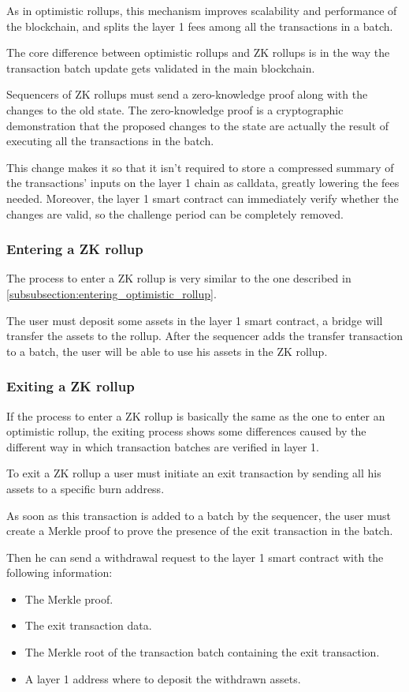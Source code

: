 \documentclass[12pt]{article}
\begin{document}
As in optimistic rollups, this mechanism improves scalability and performance of the blockchain, and splits the layer 1 fees among all the transactions in a batch.

The core difference between optimistic rollups and ZK rollups is in the way the transaction batch update gets validated in the main blockchain.

Sequencers of ZK rollups must send a zero-knowledge proof along with the changes to the old state. The zero-knowledge proof is a cryptographic demonstration that the proposed changes to the state are actually the result of executing all the transactions in the batch.

This change makes it so that it isn't required to store a compressed summary of the transactions' inputs on the layer 1 chain as calldata, greatly lowering the fees needed. Moreover, the layer 1 smart contract can immediately verify whether the changes are valid, so the challenge period can be completely removed.

\subsubsection{Entering a ZK rollup} \label{subsubsection:entering_zk_rollup}
The process to enter a ZK rollup is very similar to the one described in \ref{subsubsection:entering_optimistic_rollup}.

The user must deposit some assets in the layer 1 smart contract, a bridge will transfer the assets to the rollup. After the sequencer adds the transfer transaction to a batch, the user will be able to use his assets in the ZK rollup.

\subsubsection{Exiting a ZK rollup} \label{subsubsection:exiting_zk_rollup}
If the process to enter a ZK rollup is basically the same as the one to enter an optimistic rollup, the exiting process shows some differences caused by the different way in which transaction batches are verified in layer 1.

To exit a ZK rollup a user must initiate an exit transaction by sending all his assets to a specific burn address.

As soon as this transaction is added to a batch by the sequencer, the user must create a Merkle proof to prove the presence of the exit transaction in the batch.

Then he can send a withdrawal request to the layer 1 smart contract with the following information:
\begin{itemize}
    \item The Merkle proof.
    \item The exit transaction data.
    \item The Merkle root of the transaction batch containing the exit transaction.
    \item A layer 1 address where to deposit the withdrawn assets.
\end{itemize}
\end{document}
